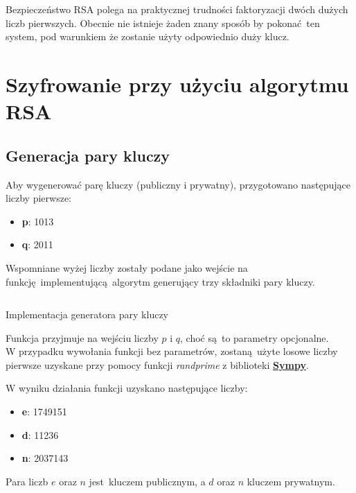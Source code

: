\documentclass[12pt]{article}
\begin{document}
Bezpieczeństwo RSA polega na praktycznej trudności
faktoryzacji dwóch dużych liczb pierwszych.
Obecnie nie istnieje żaden znany sposób by pokonać ten system,
pod warunkiem że zostanie użyty odpowiednio duży klucz.

\newpage

\section{Szyfrowanie przy użyciu algorytmu RSA}

\subsection{Generacja pary kluczy}

Aby wygenerować parę kluczy (publiczny i prywatny), 
przygotowano następujące liczby pierwsze:

\begin{itemize}
	\item \textbf{p}: 1013
	\item \textbf{q}: 2011
\end{itemize}

Wspomniane wyżej liczby zostały podane jako wejście na
funkcję implementującą algorytm generujący trzy składniki pary kluczy.

\begin{listing}[H]
	\inputminted[firstline=54,lastline=73]{python}{../rsa.py}
	\caption{Implementacja generatora pary kluczy}
\end{listing}

Funkcja przyjmuje na wejściu liczby $p$ i $q$, choć są to parametry opcjonalne.
\\

W przypadku wywołania funkcji bez parametrów, zostaną użyte losowe liczby
pierwsze uzyskane przy pomocy funkcji 
\textit{randprime} z biblioteki \textbf{\href{https://www.sympy.org}{Sympy}}.

W wyniku działania funkcji uzyskano następujące liczby:

\begin{itemize}
	\item \textbf{e}: 1749151
	\item \textbf{d}: 11236
	\item \textbf{n}: 2037143
\end{itemize}

Para liczb $e$ oraz $n$ jest kluczem publicznym, a $d$ oraz $n$ kluczem prywatnym.
\end{document}
